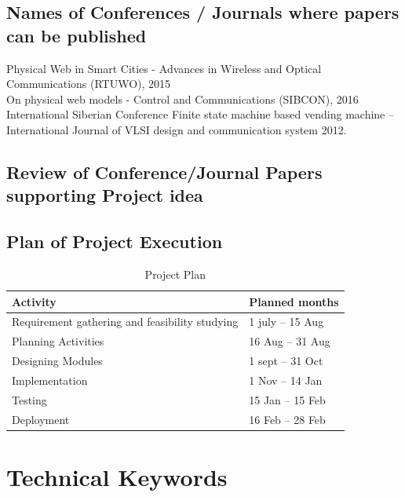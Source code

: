 \documentclass[oneside,a4paper,12pt]{report}
\begin{document}
\section{Names of Conferences / Journals where papers can be published}

 Physical Web in Smart Cities - Advances in Wireless and Optical Communications (RTUWO), 2015\\
 On physical web models - Control and Communications (SIBCON), 2016 \\
International Siberian Conference Finite state machine based vending machine – International Journal of VLSI design and communication system 2012.\\


\section{Review of Conference/Journal Papers supporting Project idea}
\label{sec:survey}

   

\section{Plan of Project Execution}

\begin{table}[!htbp]
\begin{center}
\def\arraystretch{1.5}
\begin{tabularx}{\textwidth}{| X | X |}
\hline
Activity	& Planned months\\
\hline
Requirement gathering and feasibility studying        &1 july – 15 Aug\\
\hline
Planning Activities       &16 Aug – 31 Aug\\
\hline
Designing Modules        &1 sept – 31 Oct\\
\hline
Implementation           &1 Nov – 14 Jan\\
\hline
Testing                  &15 Jan – 15 Feb\\
\hline
Deployment               &16 Feb – 28 Feb\\
\hline



\end{tabularx}
\end{center}
\caption{Project Plan}
\label{tab:usecase}
\end{table}

\chapter{Technical Keywords}
\end{document}
